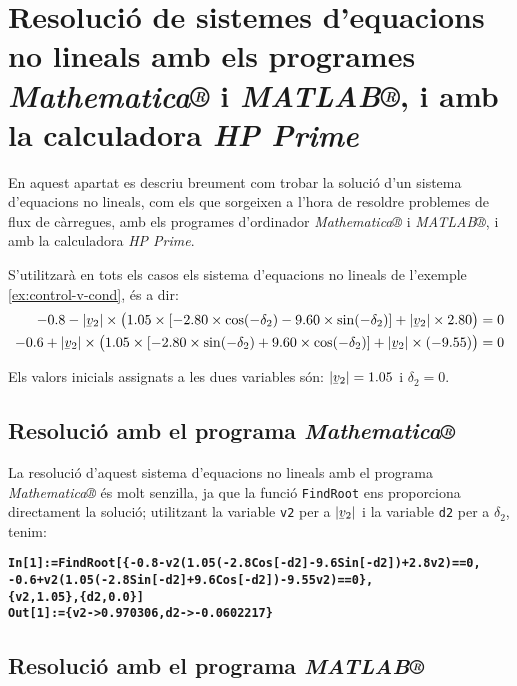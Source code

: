 \section{Resolució de sistemes d'equacions no lineals amb els programes \emph{Mathematica®} i
\emph{MATLAB®},  i amb la calculadora \emph{HP Prime}}
\label{sec:sis_eq_no_lin}


En aquest apartat es descriu breument com trobar la solució d'un sistema d'equacions no lineals, com els que sorgeixen a l'hora de resoldre problemes de flux de càrregues, amb els programes d'ordinador \emph{Mathematica®} i \emph{MATLAB®}, i amb la calculadora \emph{HP Prime}.

S'utilitzarà en tots els casos els sistema d'equacions no lineals de l'exemple \vref{ex:control-v-cond}, és a dir:
\begin{align*}
\num{-0,8} - |\cmplx{v}_2| \times \bigl( \num{1,05}\times [\num{-2,80}\times \cos(-\delta_2) - \num{9,60} \times
\sin( -\delta_2)]  + |\cmplx{v}_2| \times \num{2,80} \bigr) &= 0 \\
-\num{0,6} + |\cmplx{v}_2| \times\bigl( \num{1,05} \times[\num{-2,80}\times\sin(-\delta_2) +
\num{9,60}\times\cos( -\delta_2)]  + |\cmplx{v}_2|\times (\num{-9,55}) \bigr) &= 0
\end{align*}

Els valors inicials assignats a les dues variables són: $|\cmplx{v}_2|=\num{1,05}$ i $\delta_2=0$.

\subsection{Resolució amb el programa \emph{Mathematica®}}

La resolució d'aquest sistema d'equacions no lineals amb el programa \emph{Mathematica®} és molt senzilla, ja que la funció \texttt{FindRoot} ens proporciona directament la solució; utilitzant la variable \texttt{v2} per a $|\cmplx{v}_2|$ i la variable \texttt{d2} per a $\delta_2$, tenim:

\begin{alltt}
\bfseries\small In[1]:= FindRoot[\{-0.8 - v2 (1.05 (-2.8 Cos[-d2] - 9.6 Sin[-d2]) + 2.8 v2) == 0,
                 -0.6 + v2 (1.05 (-2.8 Sin[-d2] + 9.6 Cos[-d2]) - 9.55 v2) == 0\},
                 \{v2, 1.05\}, \{d2, 0.0\}]\\
Out[1]:= \{v2 -> 0.970306, d2 -> -0.0602217\}
\end{alltt}


\subsection{Resolució amb el programa \emph{MATLAB®}}

